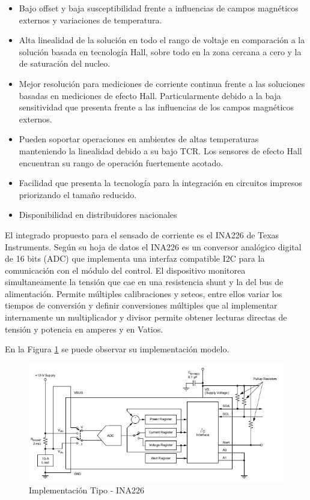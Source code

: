 \documentclass[10pt,a4paper]{article}
\begin{document}
\begin{itemize}
    \item Bajo offset y baja susceptibilidad frente a influencias de campos 
	magnéticos externos y variaciones de temperatura.
    \item Alta linealidad de la solución en todo el rango de voltaje en 
	comparación a la solución basada en tecnología Hall, sobre todo en 
	la zona cercana a cero y la de saturación del nucleo. 
    \item Mejor resolución para mediciones de corriente continua frente a 
	las soluciones basadas en mediciones de efecto Hall. 
	Particularmente debido a la baja sensitividad que presenta frente a 
	las influencias de los campos magnéticos externos.
    \item Pueden soportar operaciones en ambientes de altas temperaturas 
	manteniendo la linealidad debido a su bajo TCR. 
	Los sensores de efecto Hall encuentran su rango de operación 
	fuertemente acotado.
    \item Facilidad que presenta la tecnología para la integración en 
	circuitos impresos priorizando el tamaño reducido.
    \item Disponibilidad en distribuidores nacionales
\end{itemize}

\noindent El integrado propuesto para el sensado de corriente es el INA226 de
Texas Instruments. Seg\'un su hoja de datos \cite{ina226} el INA226 es un 
conversor analógico digital de 16 bits (ADC) que implementa una interfaz 
compatible I2C para la comunicación con el módulo del control. El dispositivo 
monitorea simultaneamente la tensión que cae en una resistencia shunt y la del 
bus de alimentación. Permite múltiples calibraciones y seteos, entre ellos 
variar los tiempos de conversión y definir conversiones múltiples que al 
implementar internamente un multiplicador y divisor permite obtener lecturas 
directas de tensión y potencia en amperes y en Vatios.

En la Figura \ref{fig:ina226-commonimplementation} se puede observar su 
implementación modelo. 

\begin{figure}[h!]
    \begin{center}
	\includegraphics[width=0.7\linewidth]{assets/INA226-Common_Implementation}
	\caption{Implementación Tipo - INA226}
	\label{fig:ina226-commonimplementation}
    \end{center}	
\end{figure}
\end{document}
